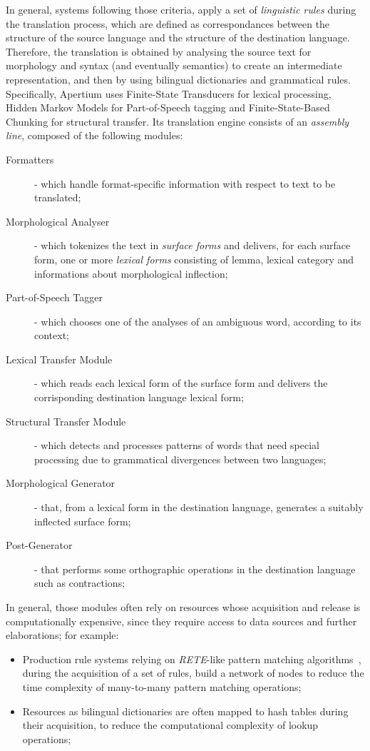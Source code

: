\documentclass[11pt]{article}
\begin{document}
In general, systems following those criteria, apply a set of \emph{linguistic rules} during the translation process, which are defined as correspondances 
between the structure of the source language and the structure of the destination language. Therefore, the translation is obtained by analysing the source 
text for morphology and syntax (and eventually semantics) to create an intermediate representation, and then by using bilingual dictionaries and grammatical
rules.\\

Specifically, Apertium uses Finite-State Transducers for lexical processing, Hidden Markov Models for Part-of-Speech tagging and Finite-State-Based Chunking
for structural transfer. Its translation engine consists of an \emph{assembly line}, composed of the following modules: 

\begin{description}
 \item[Formatters] - which handle format-specific information with respect to text to be translated;
 \item[Morphological Analyser] - which tokenizes the text in \emph{surface forms} and delivers, for each surface form, one or more \emph{lexical forms}
  consisting of lemma, lexical category and informations about morphological inflection;
 \item[Part-of-Speech Tagger] - which chooses one of the analyses of an ambiguous word, according to its context;
 \item[Lexical Transfer Module] - which reads each lexical form of the surface form and delivers the corrisponding destination language lexical form;
 \item[Structural Transfer Module] - which detects and processes patterns of words that need special processing due to grammatical divergences between two
  languages;
 \item[Morphological Generator] - that, from a lexical form in the destination language, generates a suitably inflected surface form;
 \item[Post-Generator] - that performs some orthographic operations in the destination language such as contractions;
\end{description}

In general, those modules often rely on resources whose acquisition and release is computationally expensive, since they require access to data sources 
and further elaborations; for example:

\begin{itemize}
 \item Production rule systems relying on \emph{RETE}-like pattern matching algorithms~\citep{forgy}, during the acquisition of a set of rules, build a network of nodes
  to reduce the time complexity of many-to-many pattern matching operations;
 \item Resources as bilingual dictionaries are often mapped to hash tables during their acquisition, to reduce the computational complexity of lookup operations; 
\end{itemize}
\end{document}
